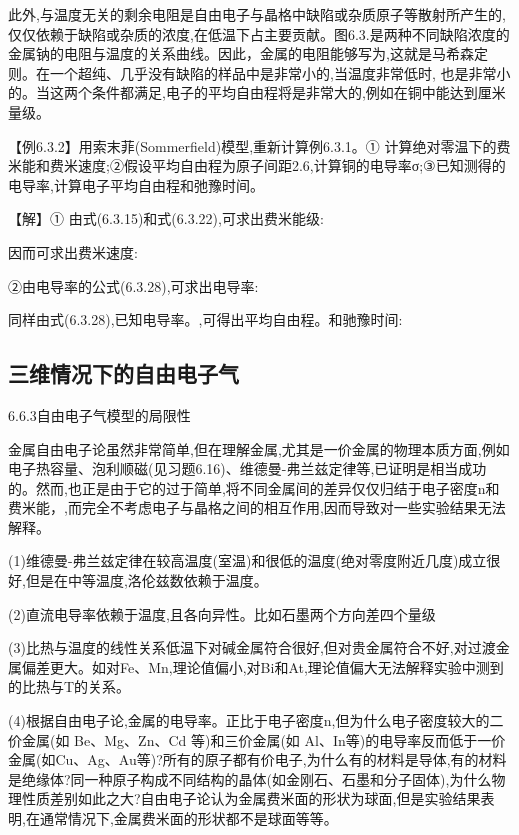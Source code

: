 此外,与温度无关的剩余电阻是自由电子与晶格中缺陷或杂质原子等散射所产生的,仅仅依赖于缺陷或杂质的浓度,在低温下占主要贡献。图6.3.是两种不同缺陷浓度的金属钠的电阻与温度的关系曲线。因此，金属的电阻能够写为,这就是马希森定则。在一个超纯、几乎没有缺陷的样品中是非常小的,当温度非常低时, 也是非常小的。当这两个条件都满足,电子的平均自由程将是非常大的,例如在铜中能达到厘米量级。



【例6.3.2】用索末菲(Sommerfield)模型,重新计算例6.3.1。① 计算绝对零温下的费米能和费米速度;②假设平均自由程为原子间距2.6,计算铜的电导率σ;③已知测得的电导率,计算电子平均自由程和弛豫时间。

【解】① 由式(6.3.15)和式(6.3.22),可求出费米能级:



因而可求出费米速度:



②由电导率的公式(6.3.28),可求出电导率:



同样由式(6.3.28),已知电导率。,可得出平均自由程。和驰豫时间:


\subsection{三维情况下的自由电子气}
6.6.3自由电子气模型的局限性

金属自由电子论虽然非常简单,但在理解金属,尤其是一价金属的物理本质方面,例如电子热容量、泡利顺磁(见习题6.16)、维德曼-弗兰兹定律等,已证明是相当成功的。然而,也正是由于它的过于简单,将不同金属间的差异仅仅归结于电子密度n和费米能，,而完全不考虑电子与晶格之间的相互作用,因而导致对一些实验结果无法解释。

(1)维德曼-弗兰兹定律在较高温度(室温)和很低的温度(绝对零度附近几度)成立很好,但是在中等温度,洛伦兹数依赖于温度。

(2)直流电导率依赖于温度,且各向异性。比如石墨两个方向差四个量级

(3)比热与温度的线性关系低温下对碱金属符合很好,但对贵金属符合不好,对过渡金属偏差更大。如对Fe、Mn,理论值偏小,对Bi和At,理论值偏大无法解释实验中测到的比热与T的关系。

(4)根据自由电子论,金属的电导率。正比于电子密度n,但为什么电子密度较大的二价金属(如 Be、Mg、Zn、Cd 等)和三价金属(如 Al、In等)的电导率反而低于一价金属(如Cu、Ag、Au等)?所有的原子都有价电子,为什么有的材料是导体,有的材料是绝缘体?同一种原子构成不同结构的晶体(如金刚石、石墨和分子固体),为什么物理性质差别如此之大?自由电子论认为金属费米面的形状为球面,但是实验结果表明,在通常情况下,金属费米面的形状都不是球面等等。

